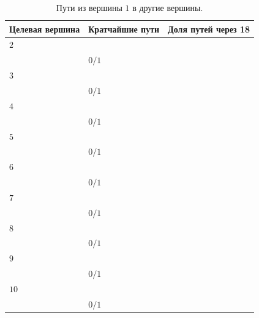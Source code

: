 \documentclass[12pt, a4paper]{extarticle}
\begin{document}
\begin{table}[h!]
    \caption{Пути из вершины $1$ в другие вершины.}
    \label{tbl:10-1}
    \begin{tabularx}{\textwidth}{|X|X|X|}
        \hline 
        Целевая вершина & Кратчайшие пути & Доля путей через 18 \\
        \hline 
        $2$ & \begin{tabular}{@{}l@{}} $[1, 3, 2]$ \\ \end{tabular} & $0/1$ \\
        \hline
        $3$ & \begin{tabular}{@{}l@{}} $[1, 3]$ \\ \end{tabular} & $0/1$ \\
        \hline
        $4$ & \begin{tabular}{@{}l@{}} $[1, 3, 6, 4]$ \\ \end{tabular} & $0/1$ \\
        \hline
        $5$ & \begin{tabular}{@{}l@{}} $[1, 3, 6, 5]$ \\ \end{tabular} & $0/1$ \\
        \hline
        $6$ & \begin{tabular}{@{}l@{}} $[1, 3, 6]$ \\ \end{tabular} & $0/1$ \\
        \hline
        $7$ & \begin{tabular}{@{}l@{}} $[1, 3, 7]$ \\ \end{tabular} & $0/1$ \\
        \hline
        $8$ & \begin{tabular}{@{}l@{}} $[1, 3, 7, 8]$ \\ \end{tabular} & $0/1$ \\
        \hline
        $9$ & \begin{tabular}{@{}l@{}} $[1, 3, 9]$ \\ \end{tabular} & $0/1$ \\
        \hline
        $10$ & \begin{tabular}{@{}l@{}} $[1, 3, 6, 10]$ \\ \end{tabular} & $0/1$ \\

\end{tabularx}
\end{table}
\end{document}
